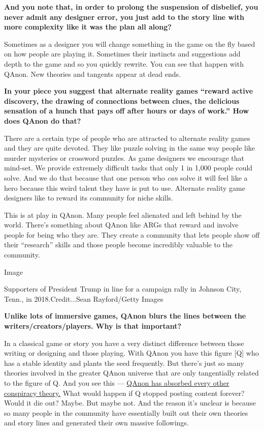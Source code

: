 \textbf{And you note that, in order to prolong the suspension of
disbelief, you never admit any designer error, you just add to the story
line with more complexity like it was the plan all along?}

Sometimes as a designer you will change something in the game on the fly
based on how people are playing it. Sometimes their instincts and
suggestions add depth to the game and so you quickly rewrite. You can
see that happen with QAnon. New theories and tangents appear at dead
ends.

\textbf{In your piece you suggest that alternate reality games ``reward
active discovery, the drawing of connections between clues, the
delicious sensation of a hunch that pays off after hours or days of
work.'' How does QAnon do that?}

There are a certain type of people who are attracted to alternate
reality games and they are quite devoted. They like puzzle solving in
the same way people like murder mysteries or crossword puzzles. As game
designers we encourage that mind-set. We provide extremely difficult
tasks that only 1 in 1,000 people could solve. And we do that because
that one person who \emph{can} solve it will feel like a hero because
this weird talent they have is put to use. Alternate reality game
designers like to reward its community for niche skills.

This is at play in QAnon. Many people feel alienated and left behind by
the world. There's something about QAnon like ARGs that reward and
involve people for being who they are. They create a community that lets
people show off their ``research'' skills and those people become
incredibly valuable to the community.

Image

Supporters of President Trump in line for a campaign rally in Johnson
City, Tenn., in 2018.Credit...Sean Rayford/Getty Images

\textbf{Unlike lots of immersive games, QAnon blurs the lines between
the writers/creators/players. Why is that important?}

In a classical game or story you have a very distinct difference between
those writing or designing and those playing. With QAnon you have this
figure {[}Q{]} who has a stable identity and plants the seed frequently.
But there's just so many theories involved in the greater QAnon universe
that are only tangentially related to the figure of Q. And you see this
---
\href{https://www.vice.com/en_us/article/v7gz53/the-conspiracy-singularity-has-arrived}{QAnon
has absorbed every other conspiracy theory.} What would happen if Q
stopped posting content forever? Would it die out? Maybe. But maybe not.
And the reason it's unclear is because so many people in the community
have essentially built out their own theories and story lines and
generated their own massive followings.

